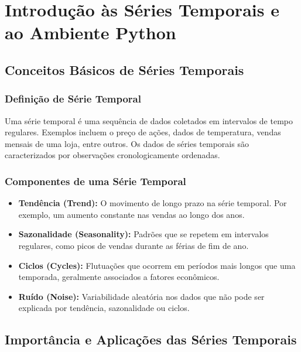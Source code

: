 \chapter{Introdução às Séries Temporais e ao Ambiente Python}

\section{Conceitos Básicos de Séries Temporais}

\subsection{Definição de Série Temporal}
Uma série temporal é uma sequência de dados coletados em intervalos de tempo regulares. Exemplos incluem o preço de ações, dados de temperatura, vendas mensais de uma loja, entre outros. Os dados de séries temporais são caracterizados por observações cronologicamente ordenadas.

\subsection{Componentes de uma Série Temporal}
\begin{itemize}
    \item \textbf{Tendência (Trend):} O movimento de longo prazo na série temporal. Por exemplo, um aumento constante nas vendas ao longo dos anos.
    \item \textbf{Sazonalidade (Seasonality):} Padrões que se repetem em intervalos regulares, como picos de vendas durante as férias de fim de ano.
    \item \textbf{Ciclos (Cycles):} Flutuações que ocorrem em períodos mais longos que uma temporada, geralmente associados a fatores econômicos.
    \item \textbf{Ruído (Noise):} Variabilidade aleatória nos dados que não pode ser explicada por tendência, sazonalidade ou ciclos.
\end{itemize}

\section{Importância e Aplicações das Séries Temporais}

